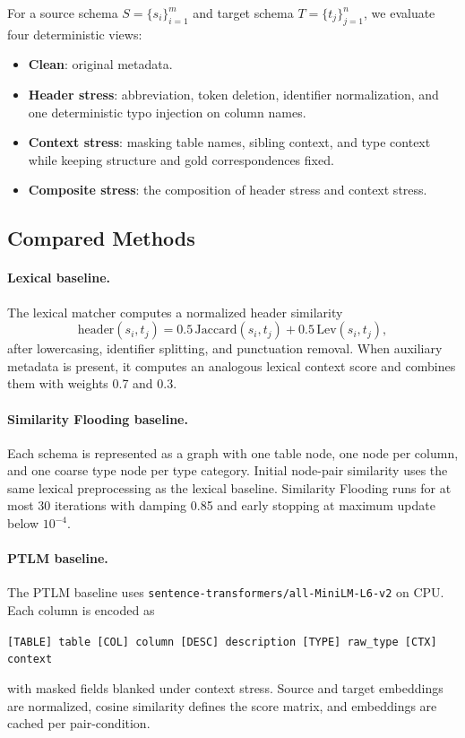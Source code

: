 \documentclass{article}
\begin{document}
For a source schema $S=\{s_i\}_{i=1}^m$ and target schema $T=\{t_j\}_{j=1}^n$, we evaluate four deterministic views:
\begin{itemize}[leftmargin=*,topsep=2pt,itemsep=2pt]
  \item \textbf{Clean}: original metadata.
  \item \textbf{Header stress}: abbreviation, token deletion, identifier normalization, and one deterministic typo injection on column names.
  \item \textbf{Context stress}: masking table names, sibling context, and type context while keeping structure and gold correspondences fixed.
  \item \textbf{Composite stress}: the composition of header stress and context stress.
\end{itemize}

\subsection{Compared Methods}

\paragraph{Lexical baseline.}
The lexical matcher computes a normalized header similarity
\[
\mathrm{header}(s_i,t_j)=0.5\,\mathrm{Jaccard}(s_i,t_j)+0.5\,\mathrm{Lev}(s_i,t_j),
\]
after lowercasing, identifier splitting, and punctuation removal. When auxiliary metadata is present, it computes an analogous lexical context score and combines them with weights 0.7 and 0.3.

\paragraph{Similarity Flooding baseline.}
Each schema is represented as a graph with one table node, one node per column, and one coarse type node per type category. Initial node-pair similarity uses the same lexical preprocessing as the lexical baseline. Similarity Flooding runs for at most 30 iterations with damping 0.85 and early stopping at maximum update below $10^{-4}$.

\paragraph{PTLM baseline.}
The PTLM baseline uses \texttt{sentence-transformers/all-MiniLM-L6-v2} on CPU. Each column is encoded as
\begin{center}
\small
\texttt{[TABLE] table [COL] column [DESC] description [TYPE] raw\_type [CTX] context}
\normalsize
\end{center}
with masked fields blanked under context stress. Source and target embeddings are normalized, cosine similarity defines the score matrix, and embeddings are cached per pair-condition.
\end{document}
